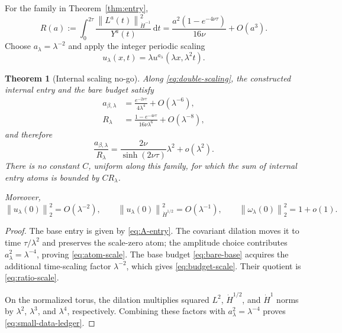 \documentclass[11pt]{article}
\newtheorem{theorem}{Theorem}[section]
\theoremstyle{definition}
\newcommand{\norm}[1]{\left\lVert #1\right\rVert}
\newcommand{\dd}{\,\mathrm d}
\begin{document}
For the family in Theorem~\ref{thm:entry},
\begin{equation}\label{eq:bare-base}
 R(a):=\int_0^{2\tau}
 \frac{\norm{L^a(t)}_{\dot H^{-1}}^2}{Y^a(t)}\dd t
 =\frac{a^2(1-e^{-4\nu\tau})}{16\nu}+O(a^3).
\end{equation}
Choose \(a_\lambda=\lambda^{-2}\) and apply the integer periodic scaling
\begin{equation}\label{eq:double-scaling}
 u_\lambda(x,t)=\lambda
 u^{a_\lambda}(\lambda x,\lambda^2t).
\end{equation}

\begin{theorem}[Internal scaling no-go]\label{thm:no-payment}
Along \eqref{eq:double-scaling}, the constructed internal entry and the bare
budget satisfy
\begin{align}
 a_{\beta,\lambda}
 &=\frac{e^{-2\nu\tau}}{4\lambda^4}+O(\lambda^{-6}),
 \label{eq:atom-scale}\\
 R_\lambda
 &=\frac{1-e^{-4\nu\tau}}{16\nu\lambda^6}
   +O(\lambda^{-8}),
 \label{eq:budget-scale}
\end{align}
and therefore
\begin{equation}\label{eq:ratio-scale}
 \frac{a_{\beta,\lambda}}{R_\lambda}
 =\frac{2\nu}{\sinh(2\nu\tau)}\lambda^2+o(\lambda^2).
\end{equation}
There is no constant \(C\), uniform along this family, for which the sum of
internal entry atoms is bounded by \(C R_\lambda\).

Moreover,
\begin{equation}\label{eq:small-data-ledger}
 \norm{u_\lambda(0)}_2^2=O(\lambda^{-2}),
 \qquad
 \norm{u_\lambda(0)}_{\dot H^{1/2}}^2=O(\lambda^{-1}),
 \qquad
 \norm{\omega_\lambda(0)}_2^2=1+o(1).
\end{equation}
\end{theorem}

\begin{proof}
The base entry is given by \eqref{eq:A-entry}.  The covariant dilation moves
it to time \(\tau/\lambda^2\) and preserves the scale-zero atom; the
amplitude choice contributes \(a_\lambda^2=\lambda^{-4}\), proving
\eqref{eq:atom-scale}.  The base budget \eqref{eq:bare-base} acquires the
additional time-scaling factor \(\lambda^{-2}\), which gives
\eqref{eq:budget-scale}.  Their quotient is \eqref{eq:ratio-scale}.

On the normalized torus, the dilation multiplies squared \(L^2\),
\(\dot H^{1/2}\), and \(\dot H^1\) norms by \(\lambda^2\),
\(\lambda^3\), and \(\lambda^4\), respectively.  Combining these factors
with \(a_\lambda^2=\lambda^{-4}\) proves
\eqref{eq:small-data-ledger}.
\end{proof}
\end{document}
